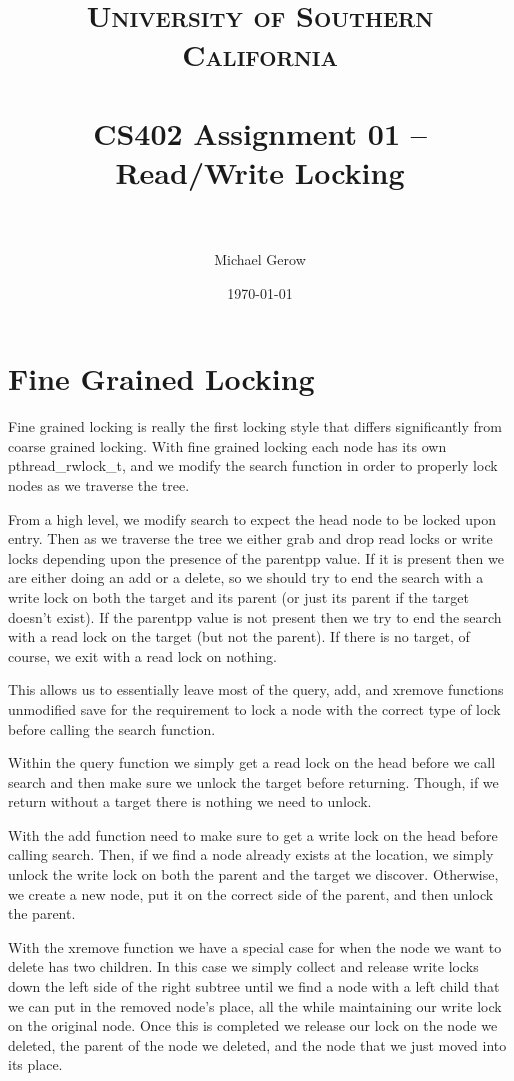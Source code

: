 \documentclass[paper=a4, fontsize=11pt]{scrartcl} %
\title{	
\normalfont \normalsize 
\textsc{University of Southern California} \\ [25pt] %
\horrule{0.5pt} \\[0.4cm] %
\huge CS402 Assignment 01 -- Read/Write Locking \\ %
\horrule{2pt} \\[0.5cm] %
}
\author{Michael Gerow} %
\date{\normalsize\today} %
\numberwithin{equation}{section} %
\numberwithin{figure}{section} %
\numberwithin{table}{section} %
\begin{document}
\maketitle %


\section{Fine Grained Locking}
Fine grained locking is really the first locking style that differs significantly from coarse grained locking. With fine grained locking each node has its own pthread\_rwlock\_t, and we modify the search function in order to properly lock nodes as we traverse the tree.

From a high level, we modify search to expect the head node to be locked upon entry. Then as we traverse the tree we either grab and drop read locks or write locks depending upon the presence of the parentpp value.  If it is present then we are either doing an add or a delete, so we should try to end the search with a write lock on both the target and its parent (or just its parent if the target doesn't exist).  If the parentpp value is not present then we try to end the search with a read lock on the target (but not the parent).  If there is no target, of course, we exit with a read lock on nothing.

This allows us to essentially leave most of the query, add, and xremove functions unmodified save for the requirement to lock a node with the correct type of lock before calling the search function.

Within the query function we simply get a read lock on the head before we call search and then make sure we unlock the target before returning.  Though, if we return without a target there is nothing we need to unlock.

With the add function need to make sure to get a write lock on the head before calling search.  Then, if we find a node already exists at the location, we simply unlock the write lock on both the parent and the target we discover.  Otherwise, we create a new node, put it on the correct side of the parent, and then unlock the parent.

With the xremove function we have a special case for when the node we want to delete has two children.  In this case we simply collect and release write locks down the left side of the right subtree until we find a node with a left child that we can put in the removed node's place, all the while maintaining our write lock on the original node.  Once this is completed we release our lock on the node we deleted, the parent of the node we deleted, and the node that we just moved into its place. 
\end{document}
